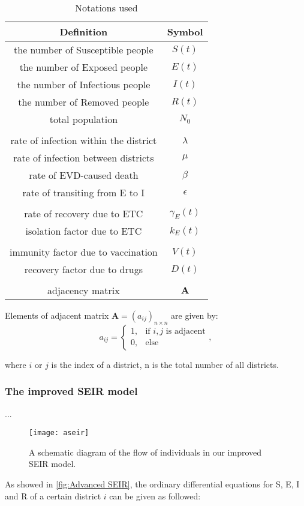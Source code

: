 \begin{table}[h!]
\caption{Notations used}
\label{t:notass}
\medskip
\centering
\begin{tabular}{c c}
\hline
Definition & Symbol \\ [0.5ex]
\hline
the number of Susceptible people & $S(t)$ \\
the number of Exposed people & $E(t)$ \\
the number of Infectious people & $I(t)$ \\
the number of Removed people & $R(t)$ \\
total population & $N_{0}$ \\
\\
rate of infection within the district & $\lambda$ \\
rate of infection between districts & $\mu$ \\
rate of EVD-caused death & $\beta$ \\
rate of transiting from E to I & $\epsilon $ \\
\\
rate of recovery due to ETC & $\gamma_{E}(t) $ \\
isolation factor due to ETC & $k_{E}(t) $ \\
\\
immunity factor due to vaccination & $V(t)$ \\
recovery factor due to drugs & $D(t)$ \\
\\
adjacency matrix & $\bm{A}$ \\
\hline
\end{tabular}
\end{table}

Elements of adjacent matrix $\bm{A} = (a_{ij})_{n\times n}$ are given by:
\begin{equation}
\label{adjac}
a_{ij}=\begin{cases} 1,&\text{if $i,j$ is adjacent}\\
0,&\text{else}
\end{cases},
\end{equation}

where $i$ or $j$ is the index of a district, n is the total number of all districts.

\subsubsection{The improved SEIR model}
...\par
\begin{figure}[ht]
\small
\centering
\texttt{[image: aseir]}
\caption{A schematic diagram of the flow of individuals in our improved SEIR model.}
\label{fig:Advanced SEIR}
\end{figure}
As showed in \autoref{fig:Advanced SEIR}, the ordinary differential equations for S, E, I and R of a certain district $i$ can be given as followed:



